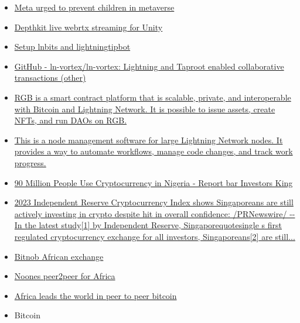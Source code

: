 \begin{itemize}
{  million meta VR users, against 60B spent}
\item
  \href{https://www.bloomberg.com/news/articles/2023-04-14/meta-urged-to-halt-plans-allowing-minors-into-the-metaverse?leadSource=uverify\%20wall}{Meta
  urged to prevent children in metaverse}
\item
  \href{https://docs.depthkit.tv/docs/remote-livestreaming-with-webrtc}{Depthkit
  live webrtx streaming for Unity}
\item
  \href{https://www.massmux.com/howto-complete-lightningtipbot-lnbits-setup-vps/}{Setup
  lnbits and lightningtipbot}
\item
  \href{https://github.com/ln-vortex/ln-vortex}{GitHub -
  ln-vortex/ln-vortex: Lightning and Taproot enabled collaborative
  transactions (other)}
\item
  \href{https://rgb.tech/?ref=nobsbitcoin.com}{RGB is a smart contract
  platform that is scalable, private, and interoperable with Bitcoin and
  Lightning Network. It is possible to issue assets, create NFTs, and
  run DAOs on RGB.}
\item
  \href{https://github.com/lncapital/torq}{This is a node management
  software for large Lightning Network nodes. It provides a way to
  automate workflows, manage code changes, and track work progress.}
\item
  \href{https://investorsking.com/2023/03/08/90-million-people-use-cryptocurrency-in-nigeria-reports/}{90
  Million People Use Cryptocurrency in Nigeria - Report bar{}
  Investors King}
\item
  \href{https://www.prnewswire.com/apac/news-releases/2023-independent-reserve-cryptocurrency-index-shows-singaporeans-are-still-actively-investing-in-crypto-despite-hit-in-overall-confidence-301783400.html}{2023
  Independent Reserve Cryptocurrency Index shows Singaporeans are still
  actively investing in crypto despite hit in overall confidence:
  /PRNewswire/ -\/- In the latest study{[}1{]} by Independent Reserve,
  Singaporequotesingle s first regulated cryptocurrency exchange
  for all investors, Singaporeans{[}2{]} are still...}
\item
  \href{https://bitnob.com/blog/how-to-buy-and-sell-bitcoin-in-nigeria}{Bitnob
  African exchange}
\item
  \href{https://bitcoinmagazine.com/business/bitcoin-entrepreneurs-introduce-noones-app-aimed-at-empowering-financial-freedom}{Noones
  peer2peer for Africa}
\item
  \href{https://twitter.com/documentingbtc/status/1646656229958361091}{Africa
  leads the world in peer to peer bitcoin}
\item
  Bitcoin


\end{itemize}
